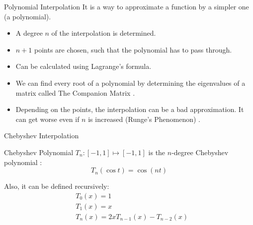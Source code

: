 \documentclass{beamer}
\begin{document}
\begin{frame}{Polynomial Interpolation}
	It is a way to approximate a function by a simpler one (a polynomial).
	
	\begin{itemize}
		\item A degree $n$ of the interpolation is determined.
		\item $n+1$ points are chosen, such that the polynomial has to pass through.
		\item Can be calculated using Lagrange's formula.
		
		\item We can find every root of a polynomial by determining the eigenvalues of a matrix called The Companion Matrix \cite[p.~195]{horn}.
		
		\item Depending on the points, the interpolation can be a bad approximation. It can get worse even if $n$ is increased (Runge's Phenomenon) \cite[p.~37]{powell}.
	\end{itemize}
\end{frame}

\begin{frame}{Chebyshev Interpolation}
	
	\begin{block}{Chebyshev Polynomial}
		$T_n: [-1, 1] \mapsto [-1, 1]$ is the $n$-degree Chebyshev polynomial \cite{chebbook}:
		\begin{equation*}
		T_n(\cos t) = \cos(nt)
		\end{equation*}
	\end{block}
	Also, it can be defined recursively:	
	\begin{align*}
	&T_0(x) = 1\\
	&T_1(x) = x\\
	&T_n(x) = 2xT_{n-1}(x) - T_{n-2}(x)
	\end{align*}
	
\end{frame}
\end{document}
